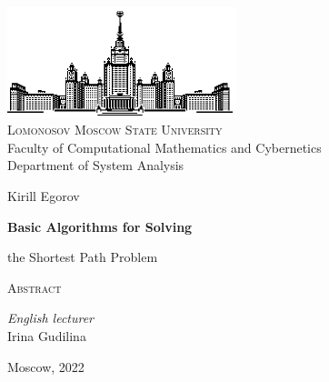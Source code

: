 \thispagestyle{empty}
\begin{center}
    \ \vspace{-3cm}

    \includegraphics[width=0.5\textwidth]{title_page/msu.eps}\\

    {\small{\scshape  Lomonosov Moscow State University}\\
    Faculty of Computational Mathematics and Cybernetics\\
    Department of System Analysis}

    \vfill

    {\Large Kirill Egorov}

    \vspace{1cm}

    {\LARGE\bfseries Basic Algorithms for Solving \par the Shortest Path Problem}

    \vspace{1.5cm}

    {\scshape Abstract}
\end{center}

\vspace{3cm}

\begin{flushright}
    \large
    \textit{English lecturer}\\
    Irina Gudilina 
\end{flushright}

\vfill

\begin{center}
    Moscow, 2022
\end{center}

\clearpage